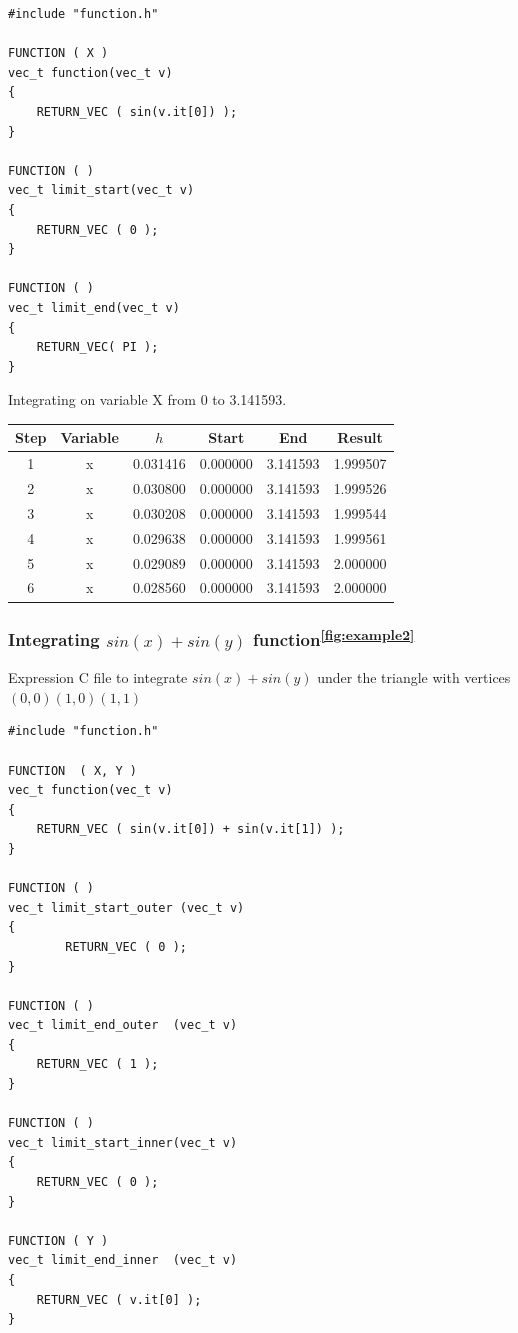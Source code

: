 \documentclass[12pt]{article}
\begin{document}
\begin{lstlisting}
#include "function.h"

FUNCTION ( X )
vec_t function(vec_t v)
{
	RETURN_VEC ( sin(v.it[0]) );
}

FUNCTION ( )
vec_t limit_start(vec_t v)
{
	RETURN_VEC ( 0 );
}

FUNCTION ( )
vec_t limit_end(vec_t v)
{
	RETURN_VEC( PI );
}
\end{lstlisting}

\begin{flushleft}
Integrating on variable X from 0 to 3.141593.
\end{flushleft}

\begin{table}[h]
	\centering
	\begin{tabular}{ |c c c c c c| }
		\hline
		\hline
		Step & Variable & $h$ & Start & End & Result \\
		\hline
		\hline
		1 & x & 0.031416 & 0.000000 & 3.141593 & 1.999507 \\
		\hline
		2 & x & 0.030800 & 0.000000 & 3.141593 & 1.999526 \\
		\hline
		3 & x & 0.030208 & 0.000000 & 3.141593 & 1.999544 \\
		\hline
		4 & x & 0.029638 & 0.000000 & 3.141593 & 1.999561 \\
		\hline
		5 & x & 0.029089 & 0.000000 & 3.141593 & 2.000000 \\
		\hline
		6 & x & 0.028560 & 0.000000 & 3.141593 & 2.000000 \\
		\hline
		\hline
	\end{tabular}
\end{table}

\subsubsection{Integrating $sin(x) + sin(y)$ function\textsuperscript{\ref{fig:example2}}}

\begin{flushleft}
Expression C file to integrate $sin(x) + sin(y)$ under the triangle with vertices $(0, 0) (1, 0) (1, 1)$
\end{flushleft}

\begin{lstlisting}
#include "function.h"

FUNCTION  ( X, Y )
vec_t function(vec_t v)
{
	RETURN_VEC ( sin(v.it[0]) + sin(v.it[1]) );
}

FUNCTION ( )
vec_t limit_start_outer (vec_t v)
{
       	RETURN_VEC ( 0 );
}

FUNCTION ( )
vec_t limit_end_outer  (vec_t v)
{
	RETURN_VEC ( 1 );
}

FUNCTION ( )
vec_t limit_start_inner(vec_t v)
{
	RETURN_VEC ( 0 );
}

FUNCTION ( Y )
vec_t limit_end_inner  (vec_t v)
{
	RETURN_VEC ( v.it[0] );
}
\end{lstlisting}
\end{document}
